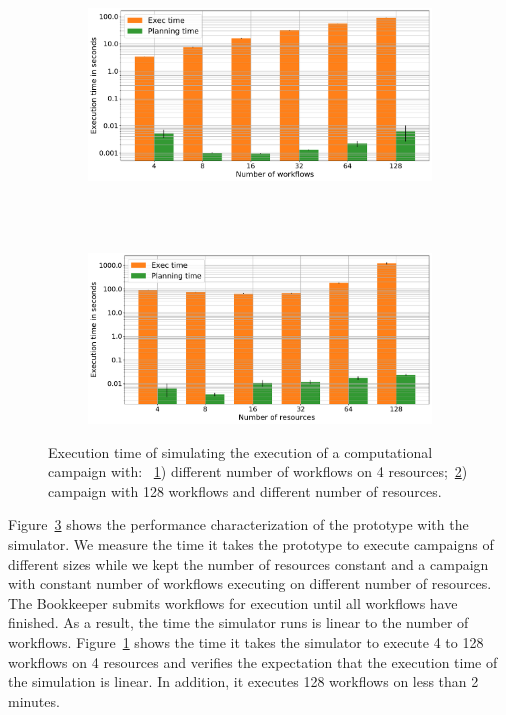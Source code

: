 \begin{figure}[t]
    \centering
    \begin{subfigure}[b]{0.75\textwidth}
        \includegraphics[width=.95\textwidth]{figures/manager/SimTimeWork.pdf}
        \caption{}
        \label{fig:SimTimeWork}
    \end{subfigure}\\
    ~ 
    \begin{subfigure}[b]{0.75\textwidth}
        \includegraphics[width=.95\textwidth]{figures/manager/SimTimeRes.pdf}
        \caption{}
        \label{fig:SimTimeRes}
    \end{subfigure}
    \caption{Execution time of simulating the execution of a computational campaign with: ~\ref{fig:SimTimeWork}) different number of workflows on 4 resources;~\ref{fig:SimTimeRes}) campaign with 128 workflows and different number of resources.}
    \label{fig:cm_char}
\end{figure}

Figure~\ref{fig:cm_char} shows the performance characterization of the prototype with the simulator.
We measure the time it takes the prototype to execute campaigns of different sizes while we kept the number of resources constant and a campaign with constant number of workflows executing on different number of resources.
The Bookkeeper submits workflows for execution until all workflows have finished.
As a result, the time the simulator runs is linear to the number of workflows.
Figure~\ref{fig:SimTimeWork} shows the time it takes the simulator to execute 4 to 128 workflows on 4 resources and verifies the expectation that the execution time of the simulation is linear.
In addition, it executes 128 workflows on less than 2 minutes.

